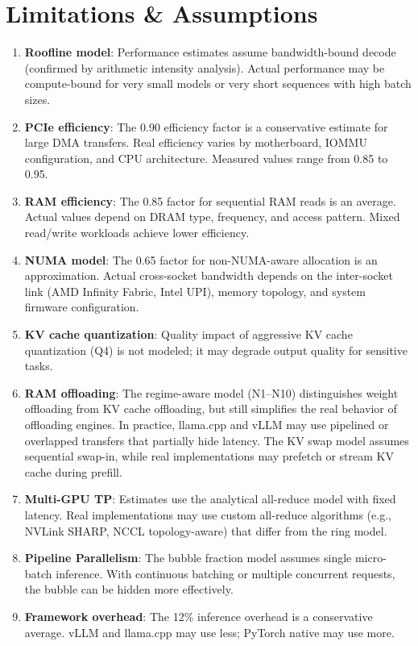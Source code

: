 \documentclass[11pt,a4paper]{article}
\theoremstyle{definition}
\begin{document}
\section{Limitations \& Assumptions}

\begin{enumerate}
  \item \textbf{Roofline model}: Performance estimates assume bandwidth-bound decode (confirmed by arithmetic intensity analysis). Actual performance may be compute-bound for very small models or very short sequences with high batch sizes.
  \item \textbf{PCIe efficiency}: The 0.90 efficiency factor is a conservative estimate for large DMA transfers. Real efficiency varies by motherboard, IOMMU configuration, and CPU architecture. Measured values range from 0.85 to 0.95.
  \item \textbf{RAM efficiency}: The 0.85 factor for sequential RAM reads is an average. Actual values depend on DRAM type, frequency, and access pattern. Mixed read/write workloads achieve lower efficiency.
  \item \textbf{NUMA model}: The 0.65 factor for non-NUMA-aware allocation is an approximation. Actual cross-socket bandwidth depends on the inter-socket link (AMD Infinity Fabric, Intel UPI), memory topology, and system firmware configuration.
  \item \textbf{KV cache quantization}: Quality impact of aggressive KV cache quantization (Q4) is not modeled; it may degrade output quality for sensitive tasks.
  \item \textbf{RAM offloading}: The regime-aware model (N1--N10) distinguishes weight offloading from KV cache offloading, but still simplifies the real behavior of offloading engines. In practice, llama.cpp and vLLM may use pipelined or overlapped transfers that partially hide latency. The KV swap model assumes sequential swap-in, while real implementations may prefetch or stream KV cache during prefill.
  \item \textbf{Multi-GPU TP}: Estimates use the analytical all-reduce model with fixed latency. Real implementations may use custom all-reduce algorithms (e.g., NVLink SHARP, NCCL topology-aware) that differ from the ring model.
  \item \textbf{Pipeline Parallelism}: The bubble fraction model assumes single micro-batch inference. With continuous batching or multiple concurrent requests, the bubble can be hidden more effectively.
  \item \textbf{Framework overhead}: The 12\% inference overhead is a conservative average. vLLM and llama.cpp may use less; PyTorch native may use more.

\end{enumerate}
\end{document}
